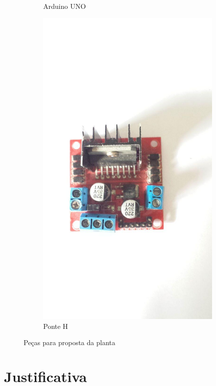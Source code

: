 \documentclass[a4paper,11pt]{article}
\begin{document}
\begin{figure}[H]
\begin{subfigure}[b]{0.32\linewidth}
        \caption{Arduino UNO}
    \end{subfigure}
    \hfill
    \begin{subfigure}[b]{0.32\linewidth}
        \centering
        \includegraphics[width=0.9\linewidth]{src/tex/img/ponteH.jpg}
        \caption{Ponte H}
    \end{subfigure}
    \caption{Peças para proposta da planta}
    \label{fig:dispositivos}
\end{figure}

\section{Justificativa}
\end{document}
